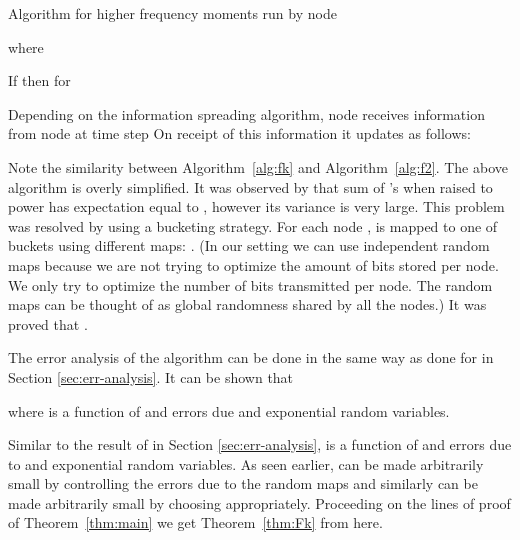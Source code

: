 \documentclass[10pt,twosided,a4paper,draft,onecolumn]{article}
\begin{document}
\begin{algorithm} 
  \caption{Algorithm for higher frequency moments run by node
    }{\label{alg:fk}} 
  \begin{algorithmic}[1] 
    \REQUIRE 
    \hspace*{0.5cm} where
      
    \STATE    
    \STATE If  then for  
    
    \STATE Depending on the information spreading algorithm, node 
    receives information from  node  at time step 
    On receipt of this information it updates as follows:  
    
    \STATE  
    \STATE 
  \end{algorithmic}
\end{algorithm}

Note the similarity between Algorithm~\ref{alg:fk} and
Algorithm~\ref{alg:f2}. The above algorithm is overly simplified.  It
was observed by \cite{Ganguly04} that sum of 's when raised to
power  has expectation equal to , however its variance is very
large. This problem was resolved by using a bucketing strategy. For
each node ,  is mapped to one of  buckets
using  different maps: . (In our setting we can use
independent random maps because we are not trying to optimize the
amount of bits stored per node. We only try to optimize the number of
bits transmitted per node. The random maps can be thought of as global
randomness shared by all the nodes.) It was proved that  \cite{Ganguly04}.

The error analysis of the algorithm can be done in the same way as
done for  in Section \ref{sec:err-analysis}. It can be shown that

where  is a function of  and errors due  and
exponential random variables.

Similar to the result of  in Section \ref{sec:err-analysis}, 
is a function of  and errors due to  and
exponential random variables. As seen earlier,  can be made
arbitrarily small by controlling the errors due to the random maps and
similarly  can be made arbitrarily small by choosing 
appropriately. Proceeding on the lines of proof of Theorem~\ref{thm:main} we get Theorem~\ref{thm:Fk} from here.
\end{document}

